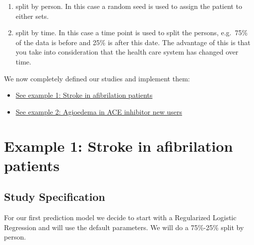 \documentclass[
]{article}
\providecommand{\tightlist}{%
  \setlength{\itemsep}{0pt}\setlength{\parskip}{0pt}}
\begin{document}
\begin{enumerate}
\def\labelenumi{\arabic{enumi}.}
\tightlist
\item
  split by person. In this case a random seed is used to assign the
  patient to either sets.
\item
  split by time. In this case a time point is used to split the persons,
  e.g.~75\% of the data is before and 25\% is after this date. The
  advantage of this is that you take into consideration that the health
  care system has changed over time.
\end{enumerate}

We now completely defined our studies and implement them:

\begin{itemize}
\tightlist
\item
  \protect\hyperlink{example1}{See example 1: Stroke in afibrilation
  patients}
\item
  \protect\hyperlink{example2}{See example 2: Agioedema in ACE inhibitor
  new users}
\end{itemize}

\hypertarget{example1}{%
\section{Example 1: Stroke in afibrilation patients}\label{example1}}

\hypertarget{study-specification-1}{%
\subsection{Study Specification}\label{study-specification-1}}

For our first prediction model we decide to start with a Regularized
Logistic Regression and will use the default parameters. We will do a
75\%-25\% split by person.
\end{document}
